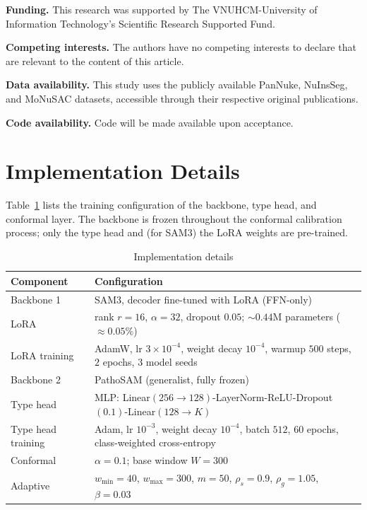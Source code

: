 \documentclass[smallextended,natbib]{svjour3}
\begin{document}
\textbf{Funding.} This research was supported by The VNUHCM-University of Information
Technology's Scientific Research Supported Fund.

\textbf{Competing interests.} The authors have no competing interests to declare
that are relevant to the content of this article.

\textbf{Data availability.} This study uses the publicly available PanNuke,
NuInsSeg, and MoNuSAC datasets, accessible through their respective original
publications.

\textbf{Code availability.} Code will be made available upon acceptance.

\appendix

\section{Implementation Details}\label{secA:impl}

Table~\ref{tab:impl} lists the training configuration of the backbone, type head,
and conformal layer. The backbone is frozen throughout the conformal calibration
process; only the type head and (for SAM3) the LoRA weights are pre-trained.
\begin{table}[htbp]
\caption{Implementation details}
\label{tab:impl}
\centering
\small
\begin{tabularx}{\textwidth}{@{}lX@{}}
\toprule
Component & Configuration \\
\midrule
Backbone 1 & SAM3, decoder fine-tuned with LoRA (FFN-only) \\
\quad LoRA & rank $r=16$, $\alpha=32$, dropout $0.05$; $\sim\!0.44$M parameters ($\approx 0.05\%$) \\
\quad LoRA training & AdamW, lr $3\times10^{-4}$, weight decay $10^{-4}$, warmup $500$ steps, $2$ epochs, $3$ model seeds \\
Backbone 2 & PathoSAM (generalist, fully frozen) \\
Type head & MLP: Linear$(256\!\to\!128)$-LayerNorm-ReLU-Dropout$(0.1)$-Linear$(128\!\to\!K)$ \\
\quad Type head training & Adam, lr $10^{-3}$, weight decay $10^{-4}$, batch $512$, $60$ epochs, class-weighted cross-entropy \\
Conformal & $\alpha=0.1$; base window $W=300$ \\
\quad Adaptive & $w_{\min}=40$, $w_{\max}=300$, $m=50$, $\rho_s=0.9$, $\rho_g=1.05$, $\beta=0.03$ \\
\bottomrule
\end{tabularx}
\end{table}
\end{document}
